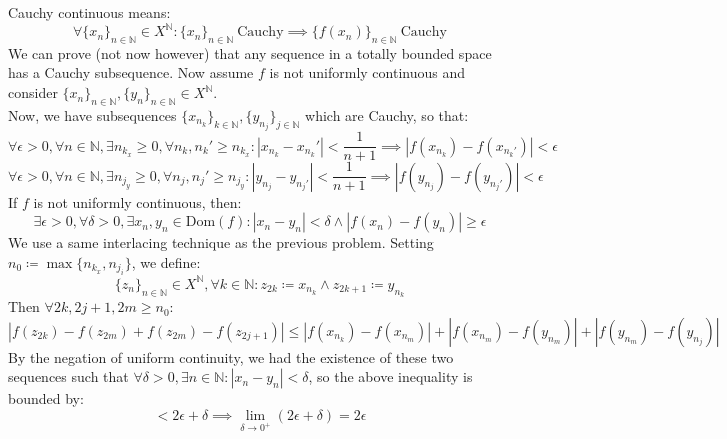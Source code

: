 \documentclass[10pt,letterpaper]{article} %
\begin{document}
Cauchy continuous means:
\begin{equation*}
\forall \{x_n\}_{n \in \mathbb{N}} \in X^\mathbb{N}: \{x_n\}_{n \in \mathbb{N}} \ \text{Cauchy} \implies \{f(x_n)\}_{n \in \mathbb{N}} \ \text{Cauchy}
\end{equation*}
We can prove (not now however) that any sequence in a totally bounded space has a Cauchy subsequence. Now assume $f$ is not uniformly continuous and consider $\{x_n\}_{n \in \mathbb{N}}, \{y_n\}_{n \in \mathbb{N}} \in X^\mathbb{N}$.\\

Now, we have subsequences $\{x_{n_k}\}_{k \in \mathbb{N}}, \{y_{n_j}\}_{j \in \mathbb{N}}$ which are Cauchy, so that:
\begin{equation*}
\forall \epsilon > 0, \forall n \in \mathbb{N}, \exists n_{k_x} \geqslant 0, \forall n_k, n_k' \geqslant n_{k_x}: |x_{n_k} - x_{n_k}'| < \frac{1}{n+1} \implies |f(x_{n_k}) - f(x_{n_k'})| < \epsilon
\end{equation*}
\begin{equation*}
\forall \epsilon > 0, \forall n \in \mathbb{N}, \exists n_{j_y} \geqslant 0, \forall n_j, n_j' \geqslant n_{j_y}: |y_{n_j} - y_{n_j'}| < \frac{1}{n+1} \implies |f(y_{n_j}) - f(y_{n_j'})| < \epsilon
\end{equation*}
If $f$ is not uniformly continuous, then:
\begin{equation*}
\exists \epsilon > 0, \forall \delta > 0, \exists x_n, y_n \in \text{Dom}(f): |x_n - y_n| < \delta \land |f(x_n) - f(y_n)| \geqslant \epsilon
\end{equation*}
We use a same interlacing technique as the previous problem. Setting $n_0 \coloneq \max\{n_{k_x}, n_{j_i}\}$, we define:
\begin{equation*}
\{z_n\}_{n \in \mathbb{N}} \in X^\mathbb{N}, \forall k \in \mathbb{N}: z_{2k} \coloneq x_{n_k} \land z_{2k+1} \coloneq y_{n_k}
\end{equation*}
Then $\forall 2k, 2j+1, 2m \geqslant n_0$:
\begin{equation*}
|f(z_{2k}) - f(z_{2m}) + f(z_{2m}) - f(z_{2j+1})| \leqslant |f(x_{n_k}) - f(x_{n_m})| + |f(x_{n_m}) - f(y_{n_m})| + |f(y_{n_m}) - f(y_{n_j})|
\end{equation*}
By the negation of uniform continuity, we had the existence of these two sequences such that $\forall \delta > 0, \exists n \in \mathbb{N}: |x_n - y_n| < \delta$, so the above inequality is bounded by:
\begin{equation*}
  < 2\epsilon + \delta \implies \lim_{\delta \xrightarrow{}0^+}(2\epsilon + \delta) = 2\epsilon
\end{equation*}
\end{document}
